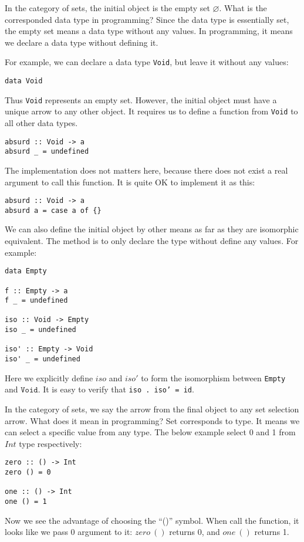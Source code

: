 \documentclass{article}
\begin{document}
\begin{example}
In the category of sets, the initial object is the empty set $\varnothing$. What is the corresponded data type in programming? Since the data type is essentially set, the empty set means a data type without any values. In programming, it means we declare a data type without defining it.

For example, we can declare a data type \texttt{Void}, but leave it without any values:

\begin{lstlisting}
data Void
\end{lstlisting}

Thus \texttt{Void} represents an empty set. However, the initial object must have a unique arrow to any other object. It requires us to define a function from \texttt{Void} to all other data types.

\begin{lstlisting}
absurd :: Void -> a
absurd _ = undefined
\end{lstlisting}

The implementation does not matters here, because there does not exist a real argument to call this function. It is quite OK to implement it as this:

\begin{lstlisting}
absurd :: Void -> a
absurd a = case a of {}
\end{lstlisting}

We can also define the initial object by other means as far as they are isomorphic equivalent. The method is to only declare the type without define any values. For example:

\begin{lstlisting}
data Empty

f :: Empty -> a
f _ = undefined

iso :: Void -> Empty
iso _ = undefined

iso' :: Empty -> Void
iso' _ = undefined
\end{lstlisting}

Here we explicitly define $iso$ and $iso'$ to form the isomorphism between \texttt{Empty} and $\texttt{Void}$. It is easy to verify that \texttt{iso . iso' = id}.

In the category of sets, we say the arrow from the final object to any set selection arrow. What does it mean in programming? Set corresponds to type. It means we can select a specific value from any type. The below example select 0 and 1 from $Int$ type respectively:

\begin{lstlisting}
zero :: () -> Int
zero () = 0

one :: () -> Int
one () = 1
\end{lstlisting}

Now we see the advantage of choosing the ``()'' symbol. When call the function, it looks like we pass 0 argument to it: $zero\ ()$ returns 0, and $one\ ()$ returns 1.
\end{example}
\end{document}
